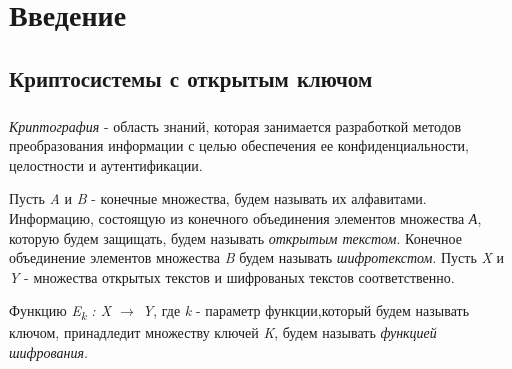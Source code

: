 \newpage
\chapter*{Введение}

\section*{Криптосистемы с открытым ключом}
\paragraph{} \textit{Криптография} - область знаний, которая занимается разработкой методов преобразования информации с целью обеспечения ее 
конфиденциальности, целостности и аутентификации.

  Пусть \textit{A} и \textit{B}  - конечные множества, будем называть их алфавитами. Информацию, состоящую из конечного объединения элементов 
множества \textit{А}, которую будем защищать, будем называть \textit{открытым текстом}. Конечное объединение элементов множества \textit{B} будем 
называть \textit{шифротекстом}. Пусть \textit{X} и \textit{Y} - множества открытых текстов и шифрованых текстов соответственно.

  Функцию \textit{E\textsubscript{k} : \textit{X} {$\rightarrow$} \textit{Y}}, где \textit{k} - параметр функции,который будем называть ключом, 
принадледит множеству ключей \textit{K}, будем называть \textit{функцией шифрования}. 

